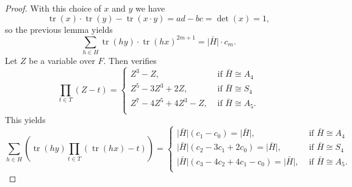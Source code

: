 \documentclass[12pt]{amsart}
\theoremstyle{plain}
\theoremstyle{definition}
\numberwithin{equation}{section}
\newcommand{\abs}[1]{\lvert#1\rvert}
\newcommand{\bH}{\bar{H}}
\DeclareMathOperator{\trace}{tr}
\begin{document}
\begin{proof}
  With this choice of $x$ and $y$ we have
  \[\trace(x)\cdot\trace(y)-\trace(x\cdot y)=ad-bc=\det(x)=1,\]
  so the previous lemma yields
     \[
       \sum_{h\in H}\trace(hy)\cdot\trace(hx)^{2m+1}%
       =\abs{\bH}\cdot c_m.
     \]
     Let $Z$ be a variable over $F$. Then \cite{dera_psl2_verify} verifies
     \[
       \prod_{t\in T}(Z-t) =
       \begin{cases}
         Z^3 - Z,&\text{ if }\bH\cong A_4\\
         Z^5 - 3Z^3 + 2Z,&\text{ if }\bH\cong S_4\\
         Z^7 - 4Z^5 + 4Z^3 - Z,&\text{ if }\bH\cong A_5.\\
       \end{cases}
     \]
This yields
     \[
       \sum_{h\in H}\left(\trace(hy)\prod_{t\in
           T}(\trace(hx)-t)\right)%
       =
       \begin{cases}
       \abs{\bH}(c_1-c_0)=\abs{\bH},&\text{ if }\bH\cong A_4\\
         \abs{\bH}(c_2-3c_1+2c_0)=\abs{\bH},&\text{ if }\bH\cong S_4\\
         \abs{\bH}(c_3-4c_2+4c_1-c_0)=\abs{\bH},&\text{ if }\bH\cong A_5.\\
       \end{cases}
     \]
\end{proof}
\end{document}

